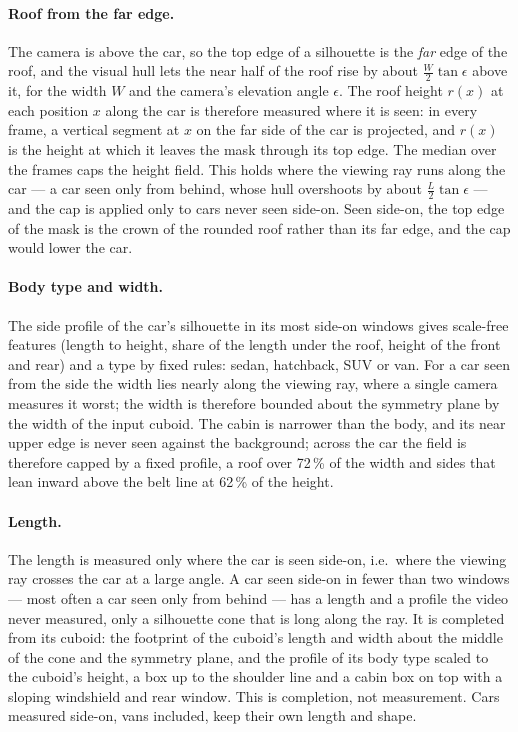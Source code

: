 \documentclass[runningheads,a4paper]{llncs}
\begin{document}
\paragraph{Roof from the far edge.} The camera is above the car, so the top edge of a silhouette is the \emph{far}
edge of the roof, and the visual hull lets the near half of the roof rise by about $\tfrac{W}{2}\tan\epsilon$ above
it, for the width $W$ and the camera's elevation angle $\epsilon$. The roof height $r(x)$ at each position $x$ along
the car is therefore measured where it is seen: in every frame, a vertical segment at $x$ on the far side of the car
is projected, and $r(x)$ is the height at which it leaves the mask through its top edge. The median over the frames
caps the height field. This holds where the viewing ray runs along the car --- a car seen only from behind, whose hull
overshoots by about $\tfrac{L}{2}\tan\epsilon$ --- and the cap is applied only to cars never seen side-on. Seen
side-on, the top edge of the mask is the crown of the rounded roof rather than its far edge, and the cap would lower
the car.

\paragraph{Body type and width.} The side profile of the car's silhouette in its most side-on windows gives
scale-free features (length to height, share of the length under the roof, height of the front and rear) and a type
by fixed rules: sedan, hatchback, SUV or van. For a car seen from the side the width lies nearly along the viewing
ray, where a single camera measures it worst; the width is therefore bounded about the symmetry plane by the width of the input cuboid. The cabin is narrower than the body, and its near upper edge is never seen against the background; across the car the field is therefore capped by a fixed profile, a roof over 72\,\% of the width and sides that lean inward above the belt line at 62\,\% of the height. 

\paragraph{Length.} The length is measured only where the car is seen side-on, i.e.\ where the viewing ray crosses the car at a large angle. A car seen
side-on in fewer than two windows --- most often a car seen only from behind --- has a length and a profile the video
never measured, only a silhouette cone that is long along the ray. It is completed from its cuboid: the footprint of
the cuboid's length and width about the middle of the cone and the symmetry plane, and the profile of its body type
scaled to the cuboid's height, a box up to the shoulder line and a cabin box on top with a sloping windshield and rear
window. This is completion, not measurement. Cars measured side-on, vans included, keep their own length and shape.
\end{document}

